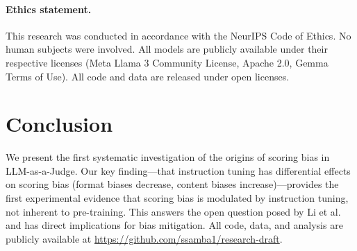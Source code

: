\documentclass[11pt,twocolumn]{article}
\begin{document}
\paragraph{Ethics statement.}
This research was conducted in accordance with the NeurIPS Code of Ethics. No human subjects were involved. All models are publicly available under their respective licenses (Meta Llama 3 Community License, Apache 2.0, Gemma Terms of Use). All code and data are released under open licenses.

\section{Conclusion}

We present the first systematic investigation of the origins of scoring bias in LLM-as-a-Judge. Our key finding---that instruction tuning has differential effects on scoring bias (format biases decrease, content biases increase)---provides the first experimental evidence that scoring bias is modulated by instruction tuning, not inherent to pre-training. This answers the open question posed by Li et al.~\cite{li2025scoring} and has direct implications for bias mitigation. All code, data, and analysis are publicly available at \url{https://github.com/ssamba1/research-draft}.
\end{document}
